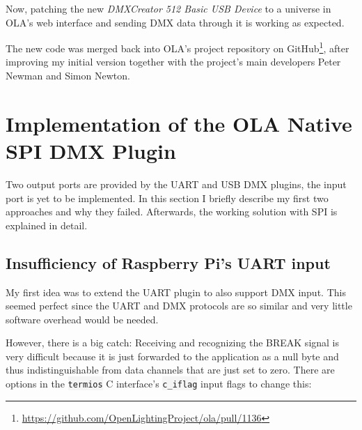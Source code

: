 Now, patching the new \emph{DMXCreator 512 Basic USB Device} to a
universe in OLA's web interface and sending DMX data through it is
working as expected.

The new code was merged back into OLA's project repository on
GitHub\footnote{\url{https://github.com/OpenLightingProject/ola/pull/1136}},
after improving my initial version together with the project's main
developers Peter Newman and Simon Newton.

\section{Implementation of the OLA Native SPI DMX
Plugin}\label{sec:ola-spidmx-plugin}

Two output ports are provided by the UART and USB DMX plugins, the input
port is yet to be implemented. In this section I briefly describe my
first two approaches and why they failed. Afterwards, the working
solution with SPI is explained in detail.

\subsection{Insufficiency of Raspberry Pi's UART
input}\label{sec:uart-insufficiency}

My first idea was to extend the UART plugin to also support DMX input.
This seemed perfect since the UART and DMX protocols are so similar and
very little software overhead would be needed.

However, there is a big catch: Receiving and recognizing the BREAK
signal is very difficult because it is just forwarded to the application
as a null byte and thus indistinguishable from data channels that are
just set to zero. There are options in the \colorbox{WhiteSmoke}{\lstinline!termios!} C
interface's \colorbox{WhiteSmoke}{\lstinline!c_iflag!} input flags to change this:

